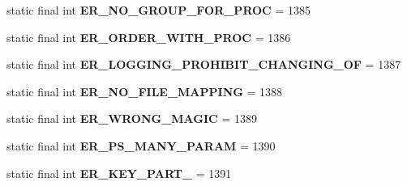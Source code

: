 \begin{DoxyCompactItemize}
\item 
\mbox{\label{classcom_1_1mysql_1_1cj_1_1exceptions_1_1_mysql_error_numbers_ad03137b479e1ed1014ad9d8333060e2e}} 
static final int {\bfseries E\+R\+\_\+\+N\+O\+\_\+\+G\+R\+O\+U\+P\+\_\+\+F\+O\+R\+\_\+\+P\+R\+OC} = 1385
\item 
\mbox{\label{classcom_1_1mysql_1_1cj_1_1exceptions_1_1_mysql_error_numbers_a73709b150b8b898c60c179dc5fdf73e6}} 
static final int {\bfseries E\+R\+\_\+\+O\+R\+D\+E\+R\+\_\+\+W\+I\+T\+H\+\_\+\+P\+R\+OC} = 1386
\item 
\mbox{\label{classcom_1_1mysql_1_1cj_1_1exceptions_1_1_mysql_error_numbers_a2efef9a0bb1432ece0d8d62666d57ffb}} 
static final int {\bfseries E\+R\+\_\+\+L\+O\+G\+G\+I\+N\+G\+\_\+\+P\+R\+O\+H\+I\+B\+I\+T\+\_\+\+C\+H\+A\+N\+G\+I\+N\+G\+\_\+\+OF} = 1387
\item 
\mbox{\label{classcom_1_1mysql_1_1cj_1_1exceptions_1_1_mysql_error_numbers_abbf1ed3f74340001e34123ca50f09332}} 
static final int {\bfseries E\+R\+\_\+\+N\+O\+\_\+\+F\+I\+L\+E\+\_\+\+M\+A\+P\+P\+I\+NG} = 1388
\item 
\mbox{\label{classcom_1_1mysql_1_1cj_1_1exceptions_1_1_mysql_error_numbers_a90c6afdea7ae580d13ef285e648cfa03}} 
static final int {\bfseries E\+R\+\_\+\+W\+R\+O\+N\+G\+\_\+\+M\+A\+G\+IC} = 1389
\item 
\mbox{\label{classcom_1_1mysql_1_1cj_1_1exceptions_1_1_mysql_error_numbers_a020e7c83dfa7e9f16e4deb9e30ccfc24}} 
static final int {\bfseries E\+R\+\_\+\+P\+S\+\_\+\+M\+A\+N\+Y\+\_\+\+P\+A\+R\+AM} = 1390
\item 
\mbox{\label{classcom_1_1mysql_1_1cj_1_1exceptions_1_1_mysql_error_numbers_a4492dd21c799f94f0b2a9fc6b80068c5}} 
static final int {\bfseries E\+R\+\_\+\+K\+E\+Y\+\_\+\+P\+A\+R\+T\+\_} = 1391
\item 

\end{DoxyCompactItemize}
